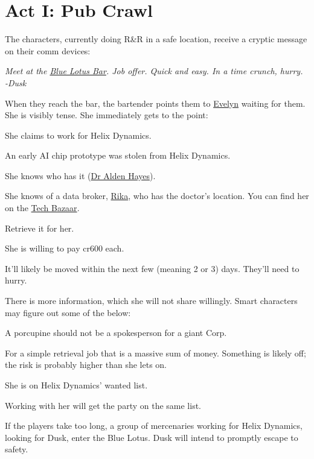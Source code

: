 \chapter{Act I: Pub Crawl}
\label{ch:act1}
\vspace{-20mm} %
The characters, currently doing R\&R in a safe location,
receive a cryptic message on their comm devices:
\begin{exampleblock}
	\itshape
	Meet at the \hyperref[location:bar]{Blue Lotus Bar}.
	Job offer. Quick and easy.
	In a time crunch, hurry.
	\\%
	-Dusk
\end{exampleblock}
When they reach the bar, the bartender points them to \hyperref[char:dusk]{Evelyn} waiting for them.
She is visibly tense.
She immediately gets to the point:
\begin{sitemize}
	\item She claims to work for Helix Dynamics.
	\item An early AI chip prototype was stolen from Helix Dynamics.
	\item She knows who has it (\hyperref[char:hayes]{Dr Alden Hayes}).
	\item She knows of a data broker, \hyperref[char:rika]{Rika},
		who has the doctor's location.
		You can find her on the \hyperref[location:techbazaar]{Tech Bazaar}.
	\item Retrieve it for her.
	\item She is willing to pay cr600 each.
	\item It'll likely be moved within the next few (meaning 2 or 3) days.
		They'll need to hurry.
\end{sitemize}
\vspace{-5mm}
There is more information,
	which she will not share willingly.
Smart characters may figure out some of the below:
\begin{sitemize}
	\item A porcupine should not be a spokesperson for a giant Corp.
	\item For a simple retrieval job that is a massive sum of money.
		Something is likely off; the risk is probably higher than she lets on.
	\item She is on Helix Dynamics' wanted list.
	\item Working with her will get the party on the same list.
\end{sitemize}

\vspace{-5mm}
If the players take too long,
	a group of mercenaries working for Helix Dynamics,
	looking for Dusk,
	enter the Blue Lotus.
Dusk will intend to promptly escape to safety.
